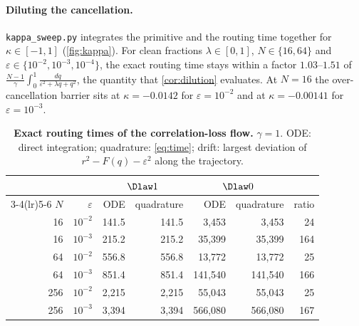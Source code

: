 \paragraph{Diluting the cancellation.} \texttt{kappa\_sweep.py} integrates the primitive and the routing time together for $\kappa\in[-1,1]$ (\cref{fig:kappa}).
For clean fractions $\lambda\in[0,1]$, $N\in\{16,64\}$ and $\varepsilon\in\{10^{-2},10^{-3},10^{-4}\}$, the exact routing time stays within a factor $1.03$--$1.51$ of
$\tfrac{N-1}{\gamma}\int_0^1\tfrac{dq}{\varepsilon^2+\lambda q+q^2}$, the quantity that \cref{cor:dilution} evaluates. At $N=16$ the over-cancellation barrier sits at
$\kappa=-0.0142$ for $\varepsilon=10^{-2}$ and at $\kappa=-0.00141$ for $\varepsilon=10^{-3}$.

\begin{table}[t]
\caption{\textbf{Exact routing times of the correlation-loss flow.} $\gamma=1$. ODE: direct integration; quadrature: \cref{eq:time}; drift:
largest deviation of $r^2-F(q)-\varepsilon^2$ along the trajectory.}
\label{tab:quadrature}
\centering\small
\begin{tabular}{@{}rr rr rr r@{}}
\toprule
 & & \multicolumn{2}{c}{$\Dlaw1$} & \multicolumn{2}{c}{$\Dlaw0$} & \\
\cmidrule(lr){3-4}\cmidrule(lr){5-6}
$N$ & $\varepsilon$ & ODE & quadrature & ODE & quadrature & ratio\\
\midrule
16  & $10^{-2}$ & 141.5  & 141.5  & 3{,}453   & 3{,}453   & 24\\
16  & $10^{-3}$ & 215.2  & 215.2  & 35{,}399  & 35{,}399  & 164\\
64  & $10^{-2}$ & 556.8  & 556.8  & 13{,}772  & 13{,}772  & 25\\
64  & $10^{-3}$ & 851.4  & 851.4  & 141{,}540 & 141{,}540 & 166\\
256 & $10^{-2}$ & 2{,}215 & 2{,}215 & 55{,}043  & 55{,}043  & 25\\
256 & $10^{-3}$ & 3{,}394 & 3{,}394 & 566{,}080 & 566{,}080 & 167\\
\bottomrule
\end{tabular}
\end{table}

